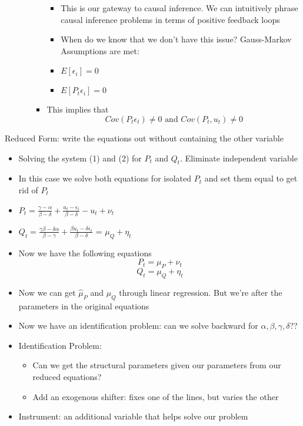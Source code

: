 \documentclass[10pt, oneside]{article}
\begin{document}
\begin{itemize}
\begin{itemize}
\begin{itemize}
\begin{itemize}
                \item This is our gateway to causal inference. We can intuitively phrase causal inference problems in terms of positive feedback loops
                \item When do we know that we don't have this issue? Gauss-Markov Assumptions are met:
                \item $E[\epsilon_i] = 0$
                \item $E[P_t \epsilon_i] = 0$
            \end{itemize}
            \item This implies that \[ Cov(P_t\epsilon_t) \neq 0\text{ and }Cov(P_t,u_t) \neq 0\]
        \end{itemize}
    \end{itemize}
\end{itemize}
Reduced Form: write the equations out without containing the other variable
\begin{itemize}
    \item Solving the system (1) and (2) for $P_t$ and $Q_t$. Eliminate independent variable
    \item In this case we solve both equations for isolated $P_t$ and set them equal to get rid of $P_t$
    \item $P_t = \frac{\gamma - \alpha}{\beta - \delta} + \frac{u_t - \epsilon_t}{\beta - \delta} - u_t + \nu_t$
    \item $Q_t = \frac{\gamma \beta - \delta \alpha}{\beta - \gamma} + \frac{\beta u_t - \delta \epsilon_t}{\beta - \delta}$ = $\mu_Q + \eta_t$
    \item Now we have the following equations\[P_t = \mu_P + \nu_t\]\[Q_t = \mu_Q + \eta_t\]
    \item Now we can get $\hat \mu_P$ and $\mu_Q$ through linear regression. But we're after the parameters in the original equations
    \item Now we have an identification problem: can we solve backward for $\alpha, \beta, \gamma, \delta$??
    \item Identification Problem:
    \begin{itemize}
        \item Can we get the structural parameters given our parameters from our reduced equations?
        \item Add an exogenous shifter: fixes one of the lines, but varies the other
    \end{itemize}
    \item Instrument: an additional variable that helps solve our problem
\end{itemize}


\end{document}
